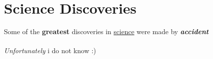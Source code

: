 \documentclass{article}
\begin{document}
	\section{Science Discoveries}
	Some of the \textbf{greatest} discoveries in \underline{science} were made by
	\textbf{\textit{accident}}
	\paragraph{}
	\emph {Unfortunately} i do not know :)
\end{document}
